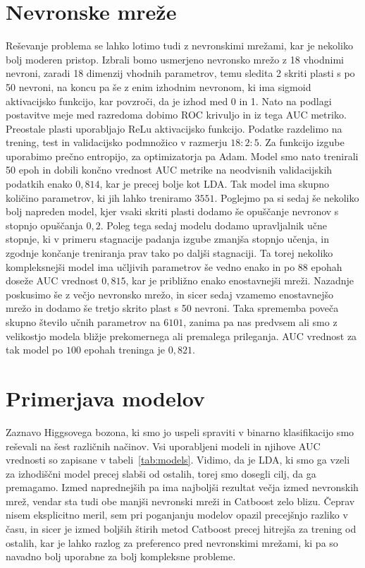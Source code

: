 \documentclass[notoc]{porocilo}
\begin{document}
\section{Nevronske mreže}
Reševanje problema se lahko lotimo tudi z nevronskimi mrežami, kar je nekoliko bolj moderen pristop. Izbrali bomo usmerjeno nevronsko mrežo z 18 vhodnimi nevroni, zaradi 18 dimenzij vhodnih parametrov, temu sledita 2 skriti plasti s po 50 nevroni, na koncu pa še z enim izhodnim nevronom, ki ima sigmoid aktivacijsko funkcijo, kar povzroči, da je izhod med 0 in 1. Nato na podlagi postavitve meje med razredoma dobimo ROC krivuljo in iz tega AUC metriko. Preostale plasti uporabljajo ReLu aktivacijsko funkcijo. Podatke razdelimo na trening, test in validacijsko podmnožico v razmerju $18:2:5$. Za funkcijo izgube uporabimo prečno entropijo, za optimizatorja pa Adam. Model smo nato trenirali 50 epoh in dobili končno vrednost AUC metrike na neodvisnih validacijskih podatkih enako $0,814$, kar je precej bolje kot LDA. Tak model ima skupno količino parametrov, ki jih lahko treniramo $3551$. Poglejmo pa si sedaj še nekoliko bolj napreden model, kjer vsaki skriti plasti dodamo še opuščanje nevronov s stopnjo opuščanja $0,2$. Poleg tega sedaj modelu dodamo upravljalnik učne stopnje, ki v primeru stagnacije padanja izgube zmanjša stopnjo učenja, in zgodnje končanje treniranja prav tako po daljši stagnaciji. Ta torej nekoliko kompleksnejši model ima učljivih parametrov še vedno enako in po 88 epohah doseže AUC vrednost $0,815$, kar je približno enako enostavnejši mreži. Nazadnje poskusimo še z večjo nevronsko mrežo, in sicer sedaj vzamemo enostavnejšo mrežo in dodamo še tretjo skrito plast s 50 nevroni. Taka sprememba poveča skupno število učnih parametrov na $6101$, zanima pa nas predvsem ali smo z velikostjo modela bližje prekomernega ali premalega prileganja. AUC vrednost za tak model po $100$ epohah treninga je $0,821$.

\section{Primerjava modelov}
Zaznavo Higgsovega bozona, ki smo jo uspeli spraviti v binarno klasifikacijo smo reševali na šest različnih načinov. Vsi uporabljeni modeli in njihove AUC vrednosti so zapisane v tabeli~\ref{tab:models}. Vidimo, da je LDA, ki smo ga vzeli za izhodiščni model precej slabši od ostalih, torej smo dosegli cilj, da ga premagamo. Izmed naprednejših pa ima najboljši rezultat večja izmed nevronskih mrež, vendar sta tudi obe manjši nevronski mreži in Catboost zelo blizu. Čeprav nisem eksplicitno meril, sem pri poganjanju modelov opazil precejšnjo razliko v času, in sicer je izmed boljših štirih metod Catboost precej hitrejša za trening od ostalih, kar je lahko razlog za preferenco pred nevronskimi mrežami, ki pa so navadno bolj uporabne za bolj kompleksne probleme.
\end{document}
